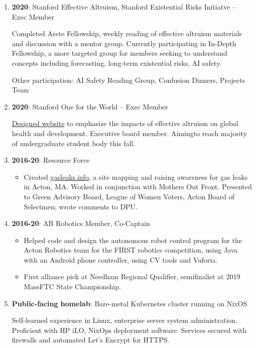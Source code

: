 \documentclass[paper=letter]{tccv}
\begin{document}
\begin{enumerate}
    \item \textbf{2020}: Stanford Effective Altruism, Stanford Existential Risks
    Initiatve -- Exec Member

        Completed Arete Fellowship, weekly reading of effective altruism
        materials and discussion with a mentor group. Currently participating in
        In-Depth Fellowship, a more targeted group for members seeking to
        understand concepts including forecasting, long-term existential risks,
        AI safety.

        Other participation: AI Safety Reading Group, Confusion Dinners,
        Projects Team

    \item \textbf{2020}: Stanford One for the World -- Exec Member

        \href{https://onefortheworld.su.domains}{Designed website} to emphasize
        the impacts of effective altruism on global health and development.
        Executive board member. Aimingto reach majority of undergraduate student
        body this fall.
    \item \textbf{2016-20}: Resource Force
        \begin{itemize}
             \item Created \href{https://gasleaks.info}{gasleaks.info}, a site
             mapping and raising awareness for gas leaks in Acton, MA. Worked in
             conjunction with Mothers Out Front. Presented to Green Advisory
             Board, League of Women Voters, Acton Board of Selectmen; wrote
             comments to DPU.
        \end{itemize}
    
    \item \textbf{2016-20}: AB Robotics Member, Co-Captain
        \begin{itemize}
           \item Helped code and design the autonomous robot control program for
           the Acton Robotics team for the FIRST robotics competition, using
           Java with an Android phone controller, using CV tools and Vuforia.
           \item First alliance pick at Needham Regional Qualifier, semifinalist
           at 2019 MassFTC State Championship.
        \end{itemize}
    \item \textbf{Public-facing homelab}: Bare-metal Kubernetes cluster running
    on NixOS

        Self-learned experience in Linux, enterprise server system
        administration. Proficient with HP iLO, NixOps deployment software.
        Services secured with firewalls and automated Let's Encrypt for HTTPS.
     
\end{enumerate}
\end{document}
